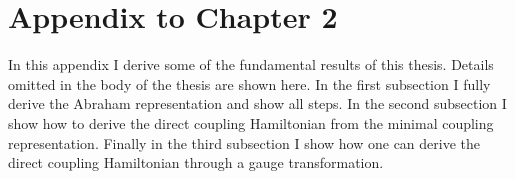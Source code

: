 \chapter{Appendix to Chapter 2}
\label{Appendix_for_Ch_2}

  
In this appendix I derive some of the fundamental results of this thesis. Details omitted in the body of the thesis are shown here.  In the first subsection I fully derive the Abraham representation and show all steps.  In the second subsection I show how to derive the direct coupling Hamiltonian from the minimal coupling representation.  Finally in the third subsection I show how one can derive the direct coupling Hamiltonian through a gauge transformation.



